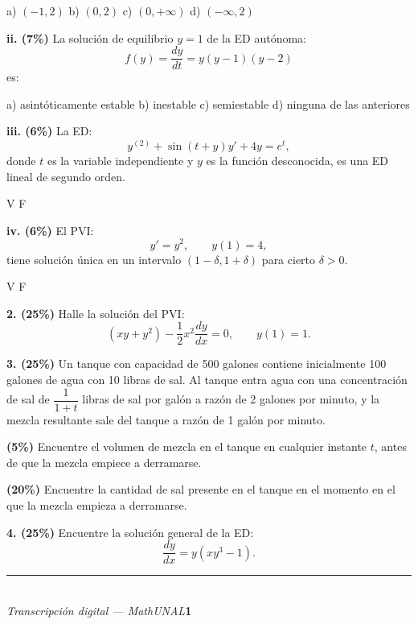 \documentclass[11pt]{article}
\begin{document}
\begin{center}
a) $(-1,2)$ \qquad b) $(0,2)$ \qquad c) $(0,+\infty)$ \qquad d) $(-\infty,2)$
\end{center}

\vspace{0.3cm}
\noindent\textbf{ii. (7\%)} La solución de equilibrio $y=1$ de la ED autónoma:
\[
f(y)=\frac{dy}{dt}=y(y-1)(y-2)
\]
es:

\begin{center}
a) asintóticamente estable \quad b) inestable \quad c) semiestable \quad d) ninguna de las anteriores
\end{center}

\vspace{0.3cm}
\noindent\textbf{iii. (6\%)} La ED:
\[
y^{(2)}+\sin(t+y)y'+4y=e^t,
\]
donde $t$ es la variable independiente y $y$ es la función desconocida, es una ED lineal de segundo orden.
\begin{center}
V \qquad F
\end{center}

\vspace{0.3cm}
\noindent\textbf{iv. (6\%)} El PVI:
\[
y'=y^2, \qquad y(1)=4,
\]
tiene solución única en un intervalo $(1-\delta,1+\delta)$ para cierto $\delta>0$.
\begin{center}
V \qquad F
\end{center}

\newpage

\noindent\textbf{2. (25\%)} Halle la solución del PVI:
\[
(xy+y^2)-\frac{1}{2}x^2\frac{dy}{dx}=0, \qquad y(1)=1.
\]

\vspace{9cm}

\newpage

\noindent\textbf{3. (25\%)} Un tanque con capacidad de 500 galones contiene inicialmente 100 galones de agua con 10 libras de sal. Al tanque entra agua con una concentración de sal de $\dfrac{1}{1+t}$ libras de sal por galón a razón de 2 galones por minuto, y la mezcla resultante sale del tanque a razón de 1 galón por minuto.

\begin{opciones}
\item[i)] \textbf{(5\%)} Encuentre el volumen de mezcla en el tanque en cualquier instante $t$, antes de que la mezcla empiece a derramarse.

\vspace{3cm}

\item[ii)] \textbf{(20\%)} Encuentre la cantidad de sal presente en el tanque en el momento en el que la mezcla empieza a derramarse.

\vspace{6cm}
\end{opciones}

\newpage

\noindent\textbf{4. (25\%)} Encuentre la solución general de la ED:
\[
\frac{dy}{dx}=y(xy^3-1).
\]

\vspace{9cm}

\vfill
\rule{\linewidth}{0.4pt}\\[1pt]
{\scriptsize\textit{Transcripción digital --- MathUNAL}\hfill\textcolor{unalblue}{\textbf{1}}}
\end{document}
